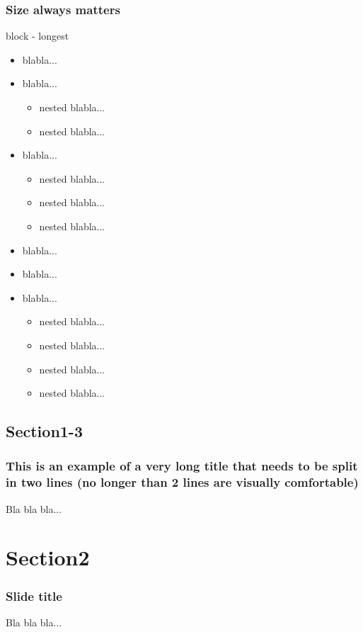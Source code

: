 \documentclass[t,compress,aspectratio=169]{beamer}
\begin{document}
\begin{frame}
\frametitle{Size always matters}
\begin{block}{block - longest}
  \begin{itemize}
    \item blabla...
    \item blabla...
    \begin{itemize}
      \item nested blabla...
      \item nested blabla...
    \end{itemize}
    \item blabla...
    \begin{itemize}
    \item nested blabla...
    \item nested blabla...
    \item nested blabla...
    \end{itemize}
    \item blabla...
    \item blabla...
    \item blabla...
    \begin{itemize}
    \item nested blabla...
    \item nested blabla...
    \item nested blabla...
    \item nested blabla...
    \end{itemize}
  \end{itemize}
\end{block}
\end{frame}

\subsection{Section1-3}
\begin{frame}
\frametitle{This is an example of a very long title that needs to be split in two lines (no longer than 2 lines are visually comfortable)}
Bla bla bla...
\end{frame}



\section{Section2}
\begin{frame}
\frametitle{Slide title}
Bla bla bla...
\end{frame}
\end{document}

